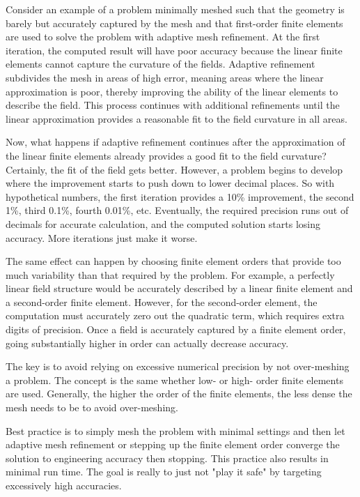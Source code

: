 \documentclass[titlepage]{article}
\renewcommand\_{\textunderscore\linebreak[1]}
\begin{document}
Consider an example of a problem minimally meshed such that the geometry is barely but accurately captured by the mesh and that first-order finite elements are used to solve the problem with adaptive mesh refinement.  At the first iteration, the computed result will have poor accuracy because the linear finite elements cannot capture the curvature of the fields.  Adaptive refinement subdivides the mesh in areas of high error, meaning areas where the linear approximation is poor, thereby improving the ability of the linear elements to describe the field.  This process continues with additional refinements until the linear approximation provides a reasonable fit to the field curvature in all areas.

Now, what happens if adaptive refinement continues after the approximation of the linear finite elements already provides a good fit to the field curvature?  Certainly, the fit of the field gets better.  However, a problem begins to develop where the improvement starts to push down to lower decimal places.  So with hypothetical numbers, the first iteration provides a 10\% improvement, the second 1\%, third 0.1\%, fourth 0.01\%, etc.  Eventually, the required precision runs out of decimals for accurate calculation, and the computed solution starts losing accuracy.  More iterations just make it worse.

The same effect can happen by choosing finite element orders that provide too much variability than that required by the problem.  For example, a perfectly linear field structure would be accurately described by a linear finite element and a second-order finite element.  However, for the second-order element, the computation must accurately zero out the quadratic term, which requires extra digits of precision.  Once a field is accurately captured by a finite element order, going substantially higher in order can actually decrease accuracy.

The key is to avoid relying on excessive numerical precision by not over-meshing a problem.  The concept is the same whether low- or high- order finite elements are used.  Generally, the higher the order of the finite elements, the less dense the mesh needs to be to avoid over-meshing.

Best practice is to simply mesh the problem with minimal settings and then let adaptive mesh refinement or stepping up the finite element order converge the solution to engineering accuracy then stopping. This practice also results in minimal run time.  The goal is really to just not "play it safe" by targeting excessively high accuracies.  
\end{document}

